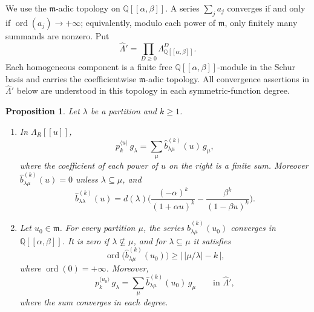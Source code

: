\documentclass[11pt]{amsart}
\numberwithin{equation}{section}
\newtheorem{proposition}[theorem]{Proposition}
\theoremstyle{definition}
\theoremstyle{remark}
\newcommand{\Lam}{\Lambda}
\newcommand{\hLam}{\widehat\Lambda}
\newcommand{\QQ}{\mathbb Q}
\begin{document}
We use the $\mathfrak m$-adic topology on $\QQ[[\alpha,\beta]]$.
A series $\sum_j a_j$ converges if and only if
$\operatorname{ord}(a_j)\to+\infty$; equivalently, modulo
each power of $\mathfrak m$, only finitely many summands
are nonzero. Put
\[
 \hLam'=\prod_{D\geq0}\Lam^D_{\QQ[[\alpha,\beta]]}.
\]
Each homogeneous component is a finite free
$\QQ[[\alpha,\beta]]$-module in the Schur basis and carries
the coefficientwise $\mathfrak m$-adic topology. All
convergence assertions in $\hLam'$ below are understood
in this topology in each symmetric-function degree.


\begin{proposition}\label{prop:deformed}
Let $\lambda$ be a partition and $k\geq1$.
\begin{enumerate}[label=\textup{(\alph*)}]
\item In $\Lam_R[[u]]$,
\[
 p^{\langle u\rangle}_k\,g_\lambda=\sum_\mu\widehat b^{(k)}_{\lambda\mu}(u)\,g_\mu ,
\]
where the coefficient of each power of $u$ on the right is a finite sum.
Moreover $\widehat b^{(k)}_{\lambda\mu}(u)=0$ unless $\lambda\subseteq\mu$, and
\[
 \widehat b^{(k)}_{\lambda\lambda}(u)
 =d(\lambda)\biggl(\frac{(-\alpha)^k}{(1+\alpha u)^k}-\frac{\beta^k}{(1-\beta u)^k}\biggr).
\]
\item Let $u_0\in\mathfrak m$. For every partition $\mu$, the series
$\widehat b^{(k)}_{\lambda\mu}(u_0)$ converges in
$\QQ[[\alpha,\beta]]$. It is zero if
$\lambda\not\subseteq\mu$, and for $\lambda\subseteq\mu$ it satisfies
\[
 \operatorname{ord}
 \bigl(\widehat b^{(k)}_{\lambda\mu}(u_0)\bigr)
 \geq \bigl|\,|\mu/\lambda|-k\,\bigr|,
\]
where $\operatorname{ord}(0)=+\infty$.
Moreover,
\[
 p^{\langle u_0\rangle}_k\,g_\lambda
 =\sum_\mu
   \widehat b^{(k)}_{\lambda\mu}(u_0)\,g_\mu
 \qquad\text{in }\hLam',
\]
where the sum converges in each degree.
\end{enumerate}
\end{proposition}
\end{document}
